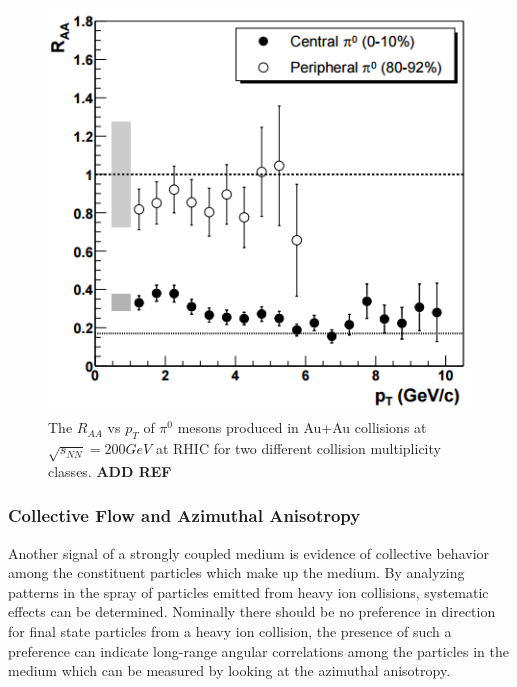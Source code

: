 \begin{figure}[!ht]
\begin{center}
\includegraphics[width=0.64\linewidth]{figs/raa_pi0_aa_cent_periph.png}
\caption{The $R_{AA}$  vs $p_T$ of $\pi^0$ mesons produced in Au+Au collisions at $\sqrt{s_{NN}} = 200 GeV$ at RHIC for two different collision multiplicity classes. \textbf{ADD REF}}
\end{center}
\label{fig:RAA_plot}
\end{figure}
\clearpage

\subsubsection{Collective Flow and Azimuthal Anisotropy}
Another signal of a strongly coupled medium is evidence of collective behavior among the constituent particles which make up the medium. By analyzing patterns in the spray of particles emitted from heavy ion collisions, systematic effects can be determined. Nominally there should be no preference in direction for final state particles from a heavy ion collision, the presence of such a preference can indicate long-range angular correlations among the particles in the medium which can be measured by looking at the azimuthal anisotropy.

